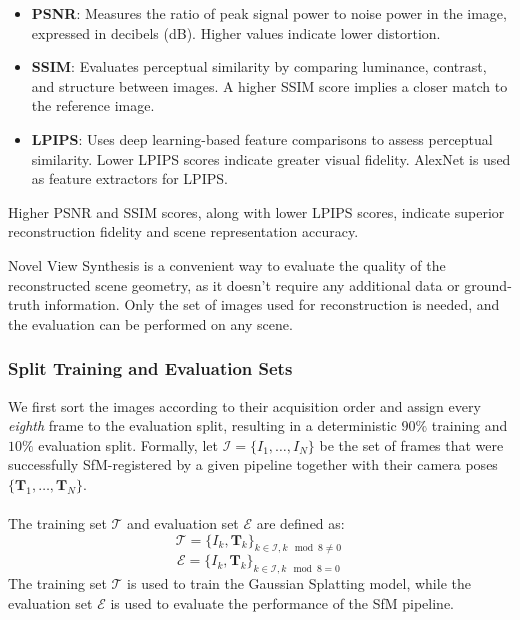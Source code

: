 \begin{itemize}
    \item \textbf{PSNR}: Measures the ratio of peak signal power to noise power in the image, expressed in decibels (dB). Higher values indicate lower distortion.
    \item \textbf{SSIM}: Evaluates perceptual similarity by comparing luminance, contrast, and structure between images. A higher SSIM score implies a closer match to the reference image.
    \item \textbf{LPIPS}: Uses deep learning-based feature comparisons to assess perceptual similarity. Lower LPIPS scores indicate greater visual fidelity. AlexNet \cite{krizhevsky2012imagenet} is used as feature extractors for LPIPS.
\end{itemize}

Higher PSNR and SSIM scores, along with lower LPIPS scores, indicate superior reconstruction fidelity and scene representation accuracy.

Novel View Synthesis is a convenient way to evaluate the quality of the reconstructed scene geometry, as it doesn't require any additional data or ground-truth information.
Only the set of images used for reconstruction is needed, and the evaluation can be performed on any scene.

\subsubsection{Split Training and Evaluation Sets}\label{sec:split_sets}

We first sort the images according to their acquisition order and assign every
\emph{eighth} frame to the evaluation split, resulting in a deterministic $90\%$ training and $10\%$ evaluation split.
Formally, let $\mathcal{I}=\{I_1,\dots,I_N\}$ be the set of frames that were successfully SfM-registered by a given pipeline together with their camera poses
$\{\mathbf{T}_1,\dots,\mathbf{T}_N\}$. \\
\\
The training set $\mathcal{T}$ and evaluation set $\mathcal{E}$ are defined as:
\begin{equation}
  \mathcal{T} = \{I_k, \mathbf{T}_k\}_{k \in \mathcal{I}, k \mod 8 \neq 0}\,
\end{equation}
\begin{equation}
  \mathcal{E} = \{I_k, \mathbf{T}_k\}_{k \in \mathcal{I}, k \mod 8 = 0}\,
\end{equation}
The training set $\mathcal{T}$ is used to train the Gaussian Splatting model, while the evaluation set $\mathcal{E}$ is used to evaluate the performance of the SfM pipeline.

